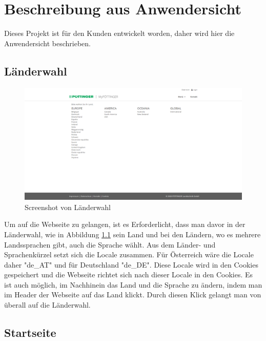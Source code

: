 \chapter{Beschreibung aus Anwendersicht} \label{anwendersicht}

Dieses Projekt ist für den Kunden entwickelt worden, daher wird hier die Anwendersicht beschrieben.

\section{Länderwahl}
\begin{figure}[H]
	\centerline{
		\includegraphics[width=1\textwidth, frame]{./grafiken/erm_country_selection.png}
	}
	\vskip0pt
	\caption{Screenshot von Länderwahl} \label{fig:countrySelection}
\end{figure}
Um auf die Webseite zu gelangen, ist es Erforderlicht, dass man davor in der Länderwahl, wie in Abbildung \ref{fig:countrySelection} sein Land und bei den Ländern, wo es mehrere Landssprachen gibt, auch die Sprache wählt. Aus dem Länder- und Sprachenkürzel setzt sich die Locale zusammen. Für Österreich wäre die Locale daher "de\_AT" und für Deutschland "de\_DE". Diese Locale wird in den Cookies gespeichert und die Webseite richtet sich nach dieser Locale in den Cookies. Es ist auch möglich, im Nachhinein das Land und die Sprache zu ändern, indem man im Header der Webseite auf das Land klickt. Durch diesen Klick gelangt man von überall auf die Länderwahl.

\section{Startseite}

